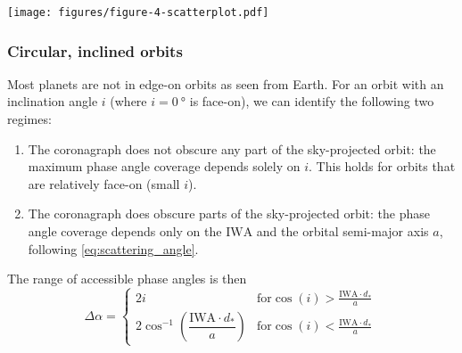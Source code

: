 \documentclass[usenatbib]{mnras}
\newcommand{\IWA}{\ensuremath{\mathrm{IWA}}\xspace}
\newcommand{\HWO}{HabWorlds\xspace}
\begin{document}
\begin{figure*}
    \centering
    \texttt{[image: figures/figure-4-scatterplot.pdf]}
    \caption{
        Scatter plot for the \HWO target stars, showing stellar effective temperatures and distances.
        The colours show $\Delta \alpha$ for hypothetical planets on circular, edge-on orbits at a semi-major axis $a$ corresponding to an Earth-like instellation and an IWA of \qty{61.9}{\mas}.
        The colour bar indicates the optical phenomena that can in principle be detected: all the phenomena from the bottom of the bar up to the colour of a given circle would be detectable for that planet.
        For example, dark blue circles indicate planets for which most phenomena would be accessible: planets that can be observed at the rainbow angle can also be observed at angles exhibiting the polarization peak due to Rayleigh scattering.
    }
    \label{fig:scatterplot}
\end{figure*}

\subsubsection{Circular, inclined orbits}

Most planets are not in edge-on orbits as seen from Earth.
For an orbit with an inclination angle $i$ (where $i=\qty{0}{\degree}$ is face-on), we can identify the following two regimes:
\begin{enumerate}
    \item The coronagraph does not obscure any part of the sky-projected orbit: 
    the maximum phase angle coverage depends solely on $i$. 
        This holds for orbits that are relatively face-on (small $i$). 
    \item The coronagraph does obscure parts of the sky-projected orbit: the phase angle coverage depends only on the \IWA and the orbital semi-major axis $a$, following \cref{eq:scattering_angle}. 
\end{enumerate}

The range of accessible phase angles is then 
\begin{equation}
\label{eq:Delta_phi_max}
    \Delta \alpha = 
    \begin{cases}
        2 i & \textrm{for} \cos(i) > \frac{\mathrm{IWA} \cdot d_* }{a} \\ 
        2 \cos^{-1}\left(\dfrac{\mathrm{IWA} \cdot d_* }{a}\right) & \textrm{for} \cos(i) < \frac{\mathrm{IWA} \cdot d_* }{a}
    \end{cases} \,
\end{equation}
\end{document}
